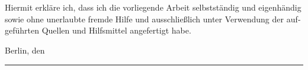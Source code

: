 \documentclass[10pt, a4paper]{article}
\theoremstyle{BoldTopSpacing}
\theoremstyle{BoldTopSpacing}
\theoremstyle{BoldTopSpacing}
\theoremstyle{BoldTopBottomSpacing}
\theoremstyle{BoldTopSpacing}
\theoremstyle{BoldTopBottomSpacing}
\theoremstyle{remark}
\begin{document}
\section*{}
\begin{otherlanguage}{german}
Hiermit erkl\"are ich, dass ich die vorliegende Arbeit selbstst\"andig und eigenh\"andig sowie ohne unerlaubte fremde Hilfe und ausschließlich unter Verwendung der aufgef\"uhrten Quellen und Hilfsmittel angefertigt habe. \par
Berlin, den \hrule
\end{otherlanguage}
\pagebreak
\pagestyle{tocstyle}
\renewcommand{\contentsname}{Contents}
\tableofcontents
\pagebreak
\listoffigures
\pagebreak
\pagestyle{fancy}
\end{document}
